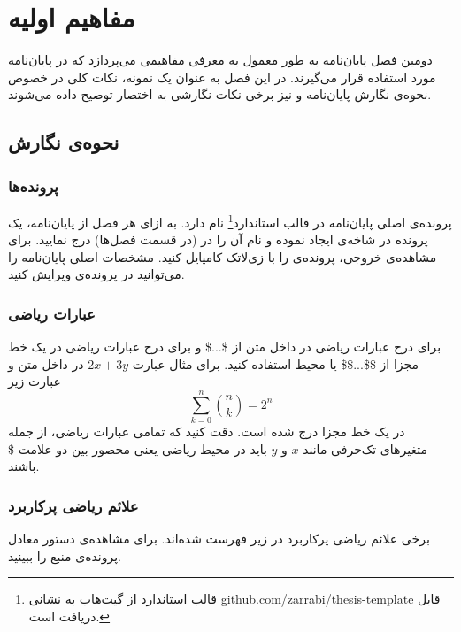 
\chapter{مفاهیم اولیه}


دومین فصل پایان‌نامه به طور معمول به معرفی مفاهیمی می‌پردازد که در پایان‌نامه مورد استفاده قرار می‌گیرند.
در این فصل به عنوان یک نمونه، نکات کلی در خصوص نحوه‌ی نگارش پایان‌نامه
و نیز برخی نکات نگارشی به اختصار توضیح داده می‌شوند.

\section{نحوه‌ی نگارش}

\subsection{پرونده‌ها}

پرونده‌ی اصلی پایان‌نامه در قالب استاندارد\footnote{
قالب استاندارد از گیت‌هاب به نشانی
\href{https://github.com/zarrabi/thesis-template}
{github.com/zarrabi/thesis-template}
قابل دریافت است.}
  نام دارد.
به ازای هر فصل از پایان‌نامه، یک پرونده در شاخه‌ی  ایجاد نموده
و نام آن را در   (در قسمت فصل‌ها) درج نمایید.
برای مشاهده‌ی خروجی، پرونده‌ی  را با زی‌لاتک کامپایل کنید.
مشخصات اصلی پایان‌نامه را می‌توانید در پرونده‌ی  ویرایش کنید.

\subsection{عبارات ریاضی}

برای درج عبارات ریاضی در داخل متن از \$...\$ و
برای درج عبارات ریاضی در یک خط مجزا از \$\$...\$\$ یا محیط 
استفاده کنید. برای مثال عبارت
$2x + 3y$
در داخل متن و عبارت زیر
\begin{equation}
\sum_{k=0}^{n} {n \choose k} = 2^n
\end{equation}
در یک خط مجزا درج شده است.
دقت کنید که تمامی عبارات ریاضی، از جمله متغیرهای تک‌حرفی مانند $x$ و $y$ باید در محیط ریاضی
یعنی محصور بین دو علامت \$ باشند.


\subsection{علائم ریاضی پرکاربرد}

برخی علائم ریاضی پرکاربرد در زیر فهرست شده‌اند.
برای مشاهده‌ی دستور  معادل پرونده‌ی منبع را ببینید.


